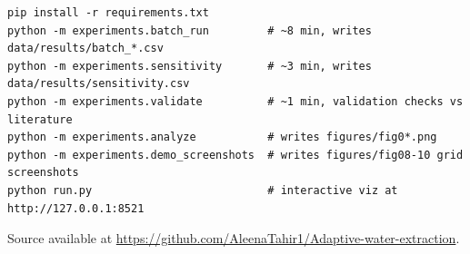 \documentclass[12pt, a4paper]{article}
\begin{document}
\begin{lstlisting}
pip install -r requirements.txt
python -m experiments.batch_run         # ~8 min, writes data/results/batch_*.csv
python -m experiments.sensitivity       # ~3 min, writes data/results/sensitivity.csv
python -m experiments.validate          # ~1 min, validation checks vs literature
python -m experiments.analyze           # writes figures/fig0*.png
python -m experiments.demo_screenshots  # writes figures/fig08-10 grid screenshots
python run.py                           # interactive viz at http://127.0.0.1:8521
\end{lstlisting}

Source available at \url{https://github.com/AleenaTahir1/Adaptive-water-extraction}.
\end{document}
